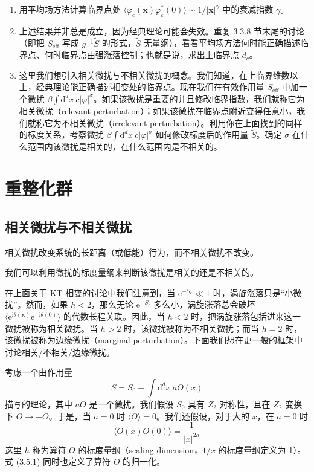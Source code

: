 \begin{enumerate}
\item 用平均场方法计算临界点处 $\langle \varphi_{c}(\pmb{x})\varphi_{c}^{*}(0)\rangle \sim 1/|\pmb{x}|^{\gamma}$ 中的衰减指数 $\gamma$。
\item 上述结果并非总是成立，因为经典理论可能会失效。重复 3.3.8 节末尾的讨论（即把 $S_{\mathrm{eff}}$ 写成 $g^{-1}\tilde{S}$ 的形式，$\tilde{S}$ 无量纲），看看平均场方法何时能正确描述临界点、何时临界点由强涨落控制；也就是说，求出上临界点 $d_{c}$。
\item 这里我们想引入相关微扰与不相关微扰的概念。我们知道，在上临界维数以上，经典理论能正确描述相变处的临界点。现在我们在有效作用量 $S_{\mathrm{eff}}$ 中加一个微扰 $\beta\int \mathrm{d}^{d}x\ c|\varphi|^{\sigma}$。如果该微扰是重要的并且修改临界指数，我们就称它为相关微扰（relevant perturbation）；如果该微扰在临界点附近变得任意小，我们就称它为不相关微扰（irrelevant perturbation）。利用你在上面找到的同样的标度关系，考察微扰 $\beta\int \mathrm{d}^{d}x\ c|\varphi|^{\sigma}$ 如何修改标度后的作用量 $\tilde{S}$。确定 $\sigma$ 在什么范围内该微扰是相关的，在什么范围内是不相关的。
\end{enumerate}

\section{重整化群}

\subsection{相关微扰与不相关微扰}
\begin{keypoints}
\item 相关微扰改变系统的长距离（或低能）行为，而不相关微扰不改变。
\item 我们可以利用微扰的标度量纲来判断该微扰是相关的还是不相关的。
\end{keypoints}

在上面关于 KT 相变的讨论中我们注意到，当 $\mathrm{e}^{-S_{c}} \ll 1$ 时，涡旋涨落只是“小微扰”。然而，如果 $h < 2$，那么无论 $\mathrm{e}^{-S_{c}}$ 多么小，涡旋涨落总会破坏 $\langle \mathrm{e}^{\mathrm{i}\theta(\pmb{x})}\mathrm{e}^{-\mathrm{i}\theta(0)}\rangle$ 的代数长程关联。因此，当 $h<2$ 时，把涡旋涨落包括进来这一微扰被称为相关微扰。当 $h>2$ 时，该微扰被称为不相关微扰；而当 $h=2$ 时，该微扰被称为边缘微扰（marginal perturbation）。下面我们想在更一般的框架中讨论相关/不相关/边缘微扰。

考虑一个由作用量
\begin{equation*}
S = S_{0} + \int \mathrm{d}^{d}x\ aO(x)
\end{equation*}
描写的理论，其中 $aO$ 是一个微扰。我们假设 $S_{0}$ 具有 $Z_{2}$ 对称性，且在 $Z_{2}$ 变换下 $O \to -O$。于是，当 $a=0$ 时 $\langle O\rangle = 0$。我们还假设，对于大的 $x$，在 $a=0$ 时
\begin{equation*}
\langle O(x)O(0)\rangle = \frac{1}{|x|^{2h}}
\tag{3.5.1}
\end{equation*}
这里 $h$ 称为算符 $O$ 的标度量纲（scaling dimension，$1/x$ 的标度量纲定义为 1）。式 (3.5.1) 同时也定义了算符 $O$ 的归一化。

